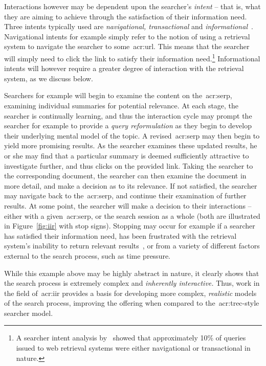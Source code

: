 Interactions however may be dependent upon the searcher's \emph{intent} -- that is, what they are aiming to achieve through the satisfaction of their information need. Three intents typically used are \emph{navigational, transactional} and \emph{informational}~\citep{jansen2008intents}. Navigational intents for example simply refer to the notion of using a retrieval system to navigate the searcher to some~\gls{acr:url}. This means that the searcher will simply need to click the link to satisfy their information need.\footnote{A searcher intent analysis by~\cite{jansen2008intents} showed that approximately 10\% of queries issued to web retrieval systems were either navigational or transactional in nature.} Informational intents will however require a greater degree of interaction with the retrieval system, as we discuss below.

Searchers for example will begin to examine the content on the~\gls{acr:serp}, examining individual summaries for potential relevance. At each stage, the searcher is continually learning, and thus the interaction cycle may prompt the searcher for example to provide a \emph{query reformulation} as they begin to develop their underlying mental model of the topic. A revised~\gls{acr:serp} may then begin to yield more promising results. As the searcher examines these updated results, he or she may find that a particular summary is deemed sufficiently attractive to investigate further, and thus clicks on the provided link. Taking the searcher to the corresponding document, the searcher can then examine the document in more detail, and make a decision as to its relevance. If not satisfied, the searcher may navigate back to the~\gls{acr:serp}, and continue their examination of further results. At some point, the searcher will make a decision to  their interactions -- either with a given~\gls{acr:serp}, or the search session as a whole (both are illustrated in Figure~\ref{fig:iir} with stop signs). Stopping may occur for example if a searcher has satisfied their information need, has been frustrated with the retrieval system's inability to return relevant results~\citep{cooper1973retrieval_effectiveness_ii}, or from a variety of different factors external to the search process, such as time pressure.

While this example above may be highly abstract in nature, it clearly shows that the search process is extremely complex and \emph{inherently interactive.} Thus, work in the field of~\gls{acr:iir} provides a basis for developing more complex, \emph{realistic} models of the search process, improving the offering when compared to the~\gls{acr:trec}-style searcher model.

